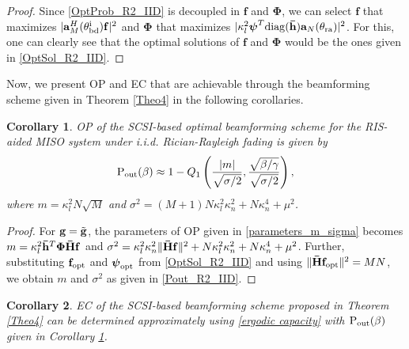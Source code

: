 \documentclass[journal,draftclsnofoot,onecolumn,12pt]{IEEEtran}
\newtheorem{corollary}{Corollary}[theorem]
\begin{document}
\begin{proof}
    Since \eqref{OptProb_R2_IID} is decoupled in $\mathbf{f}$ and $\mathbf{\Phi}$, we can select $\mathbf{f}$ that maximizes $|\mathbf{a}^H_M(\mathbf{\theta}_{\rm bd}^{\rm i})\mathbf{f}|^2$ and $\mathbf{\Phi}$ that maximizes $|\kappa_l^2\boldsymbol{\psi}^T{\rm diag}(\mathbf{\bar{h}})\mathbf{a}_N(\mathbf{\theta}_{\rm ra})|^2$. For this, one can clearly see that the optimal solutions of $\mathbf{f}$ and $\mathbf{\Phi}$ would be the ones given in \eqref{OptSol_R2_IID}.
\end{proof}
Now, we present OP and EC that are achievable through the beamforming scheme given in Theorem \ref{Theo4} in the following corollaries.
\vspace{-0.3cm}
\begin{corollary}
\label{cor:outage_R2IID}
    OP of the SCSI-based optimal beamforming scheme for the RIS-aided MISO system under {\rm i.i.d.} Rician-Rayleigh fading is given by
    \begin{align}
        {\rm P_{out}}(\beta) \approx 1-Q_1\left(\frac{|m|}{\sqrt{\sigma/2}},\frac{\sqrt{\beta/\gamma}}{\sqrt{\sigma/2}}\right),\label{Pout_R2_IID}
    \end{align}
    where $m = \kappa_l^2N\sqrt{M}$ and
    $\sigma^2 = (M + 1) N\kappa_l^2 \kappa_n^2 + N \kappa_n^4 + \mu^2$.
\end{corollary}
\begin{proof}
   For $\mathbf{g} = \Tilde{\mathbf{g}}$, the parameters of OP given in \eqref{parameters_m_sigma} becomes  $m=\kappa_l^2\mathbf{\Bar{h}}^T\mathbf{\Phi \bar{H}f}$ and $\sigma^2=\kappa_l^2\kappa_n^2\|\mathbf{\Bar{H}f}\|^2 + N\kappa_l^2\kappa_n^2 + N\kappa_n^4 + \mu^2$. Further, substituting $\mathbf{f}_{\rm opt}$ and $\boldsymbol{\psi}_{\rm opt}$ from \eqref{OptSol_R2_IID} and using $\|\mathbf{\Bar{H}f_{\rm opt}}\|^2 = MN$, we obtain $m$ and $\sigma^2$ as given in \eqref{Pout_R2_IID}.
\end{proof}
\vspace{-0.3cm}
\begin{corollary}
    EC of the SCSI-based  beamforming scheme proposed in  Theorem \ref{Theo4} can be determined approximately using \eqref{ergodic capacity} with  ${\rm P_{out}}(\beta)$ given in Corollary \ref{cor:outage_R2IID}.
\end{corollary}
\vspace{-0.7cm}
\end{document}
